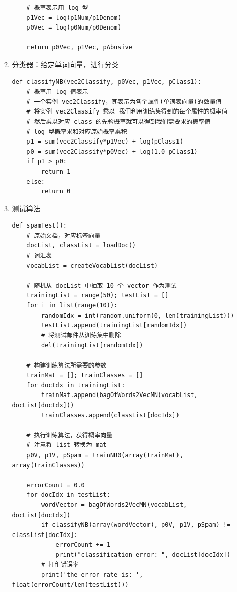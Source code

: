 \documentclass[11pt]{ctexart}
\begin{document}
\begin{enumerate}
\begin{enumerate}
\begin{lstlisting}
    # 概率表示用 log 型
    p1Vec = log(p1Num/p1Denom)
    p0Vec = log(p0Num/p0Denom)

    return p0Vec, p1Vec, pAbusive
\end{lstlisting}
\item 分类器：给定单词向量，进行分类
\lstset{language=Python,label= ,caption= ,captionpos=b,numbers=none}
\begin{lstlisting}
def classifyNB(vec2Classify, p0Vec, p1Vec, pClass1):
    # 概率用 log 值表示
    # 一个实例 vec2Classify，其表示为各个属性(单词表向量)的数量值
    # 将实例 vec2Classify 乘以 我们利用训练集得到的每个属性的概率值
    # 然后乘以对应 class 的先验概率就可以得到我们需要求的概率值
    # log 型概率求和对应原始概率乘积
    p1 = sum(vec2Classify*p1Vec) + log(pClass1)
    p0 = sum(vec2Classify*p0Vec) + log(1.0-pClass1)
    if p1 > p0:
        return 1
    else:
        return 0
\end{lstlisting}
\item 测试算法
\lstset{language=Python,label= ,caption= ,captionpos=b,numbers=none}
\begin{lstlisting}
def spamTest():
    # 原始文档，对应标签向量
    docList, classList = loadDoc()
    # 词汇表
    vocabList = createVocabList(docList)

    # 随机从 docList 中抽取 10 个 vector 作为测试
    trainingList = range(50); testList = []
    for i in list(range(10)):
        randomIdx = int(random.uniform(0, len(trainingList)))
        testList.append(trainingList[randomIdx])
        # 将测试邮件从训练集中删除
        del(trainingList[randomIdx])

    # 构建训练算法所需要的参数
    trainMat = []; trainClasses = []
    for docIdx in trainingList:
        trainMat.append(bagOfWords2VecMN(vocabList, docList[docIdx]))
        trainClasses.append(classList[docIdx])

    # 执行训练算法，获得概率向量
    # 注意将 list 转换为 mat
    p0V, p1V, pSpam = trainNB0(array(trainMat), array(trainClasses))

    errorCount = 0.0
    for docIdx in testList:
        wordVector = bagOfWords2VecMN(vocabList, docList[docIdx])
        if classifyNB(array(wordVector), p0V, p1V, pSpam) != classList[docIdx]:
            errorCount += 1
            print("classification error: ", docList[docIdx])
        # 打印错误率
        print('the error rate is: ', float(errorCount/len(testList)))
\end{lstlisting}
\end{enumerate}
\end{enumerate}
\end{document}
